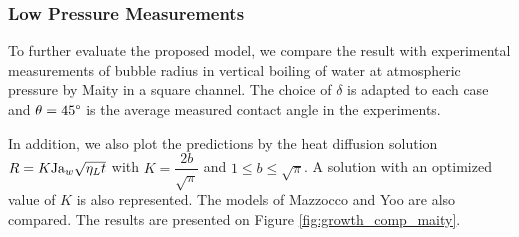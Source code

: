 \subsubsection{Low Pressure Measurements}
To further evaluate the proposed model, we compare the result with experimental measurements of bubble radius in vertical boiling of water at atmospheric pressure by Maity \cite{maity_effect_2000} in a square channel. The choice of $\delta$ is adapted to each case and $\theta=45\degree$ is the average measured contact angle in the experiments.

In addition, we also plot the predictions by the heat diffusion solution $R=K\mathrm{Ja}_{w}\sqrt{\eta_{L}t}$ with $K=\dfrac{2b}{\sqrt{\pi}}$ and $1 \leq b \leq \sqrt{\pi}$. A solution with an optimized value of $K$ is also represented. The models of Mazzocco and Yoo \etal are also compared. The results are presented on Figure \ref{fig:growth_comp_maity}.

